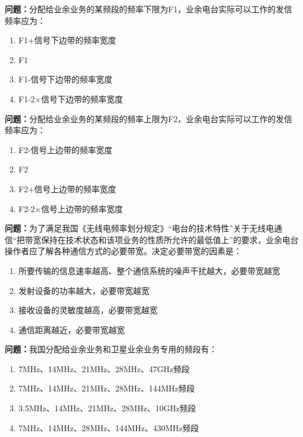 \bigskip


\noindent\textbf{问题：}分配给业余业务的某频段的频率下限为F1，业余电台实际可以工作的发信频率应为：
\begin{enumerate}[label=\Alph*), leftmargin=3em]
\item F1+信号下边带的频率宽度
\item F1
\item F1-信号下边带的频率宽度
\item F1-2×信号下边带的频率宽度
\end{enumerate}

\bigskip


\noindent\textbf{问题：}分配给业余业务的某频段的频率上限为F2，业余电台实际可以工作的发信频率应为：
\begin{enumerate}[label=\Alph*), leftmargin=3em]
\item F2-信号上边带的频率宽度
\item F2
\item F2+信号上边带的频率宽度
\item F2-2×信号上边带的频率宽度
\end{enumerate}

\bigskip


\noindent\textbf{问题：}为了满足我国《无线电频率划分规定》“电台的技术特性”关于无线电通信“把带宽保持在技术状态和该项业务的性质所允许的最低值上”的要求，业余电台操作者应了解各种通信方式的必要带宽。决定必要带宽的因素是：
\begin{enumerate}[label=\Alph*), leftmargin=3em]
\item 所要传输的信息速率越高、整个通信系统的噪声干扰越大，必要带宽越宽
\item 发射设备的功率越大，必要带宽越宽
\item 接收设备的灵敏度越高，必要带宽越宽
\item 通信距离越近，必要带宽越宽
\end{enumerate}

\bigskip


\noindent\textbf{问题：}我国分配给业余业务和卫星业余业务专用的频段有：
\begin{enumerate}[label=\Alph*), leftmargin=3em]
\item 7MHz、14MHz、21MHz、28MHz、47GHz频段
\item 7MHz、14MHz、21MHz、28MHz、144MHz频段
\item 3.5MHz、14MHz、21MHz、28MHz、10GHz频段
\item 7MHz、14MHz、28MHz、144MHz、430MHz频段
\end{enumerate}

